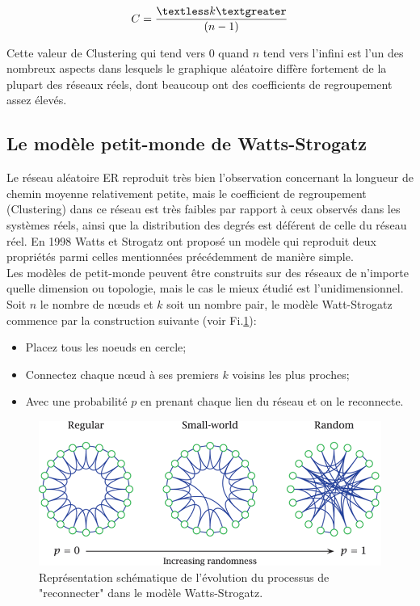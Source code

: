  \begin{equation}
 C=\dfrac{\textless k\textgreater}{(n - 1)}
 \end{equation}
 
Cette valeur de Clustering qui tend vers $0$ quand $n$ tend vers l'infini est l'un des nombreux aspects dans lesquels le graphique aléatoire diffère fortement de la plupart des réseaux réels, dont beaucoup ont des coefficients de regroupement assez élevés.
 
 
 \subsection{Le modèle petit-monde de Watts-Strogatz}
 

   Le réseau aléatoire ER reproduit très bien l'observation concernant la longueur de chemin moyenne relativement petite, mais le coefficient de regroupement (Clustering) dans ce réseau est très faibles par rapport à ceux observés dans les systèmes réels, ainsi que la distribution des degrés est déférent de celle du réseau réel. En 1998 Watts et Strogatz \cite{Watss-Strogatz1998} ont proposé un modèle qui reproduit deux propriétés parmi celles mentionnées précédemment de manière simple.\\
   Les modèles de petit-monde peuvent être construits sur des réseaux de n'importe quelle dimension ou topologie, mais le cas le mieux étudié est l'unidimensionnel. Soit $n$ le nombre de nœuds et $k$ soit un nombre pair, le modèle Watt-Strogatz commence par la construction suivante (voir Fi.\ref{SW1}): 
   \begin{itemize}
   	\item Placez tous les noeuds en cercle;
   	\item Connectez chaque nœud à ses premiers $k$ voisins les plus proches;
   	\item  Avec une probabilité $p$ en prenant chaque lien du réseau et on le reconnecte.
   \end{itemize}
   \begin{figure}[h!]
   	\centering
   	\includegraphics[scale=0.6]{./figures/SW1}
   	\caption{Représentation schématique de l'évolution du processus de "reconnecter" dans le modèle Watts-Strogatz.}  	
   	\label{SW1}
   \end{figure}

